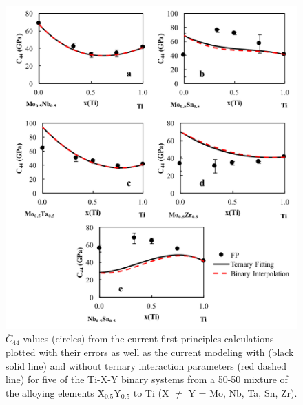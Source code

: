 \pagebreak
\begin{figure}[H]
	\centering
	\includegraphics[width=\textwidth]{Chapter-6/Figures/tixyc441.png}
	\caption{$\overline{C}_{44}$ values (circles) from the current first-principles calculations plotted with their errors as well as the current modeling with (black solid line) and without ternary interaction parameters (red dashed line) for five of the Ti-X-Y binary systems from a 50-50 mixture of the alloying elements X$_{0.5}$Y$_{0.5}$ to Ti (X $\neq$ Y = Mo, Nb, Ta, Sn, Zr).}
	\label{Ch6-figure:tixyc44_1}
\end{figure}

